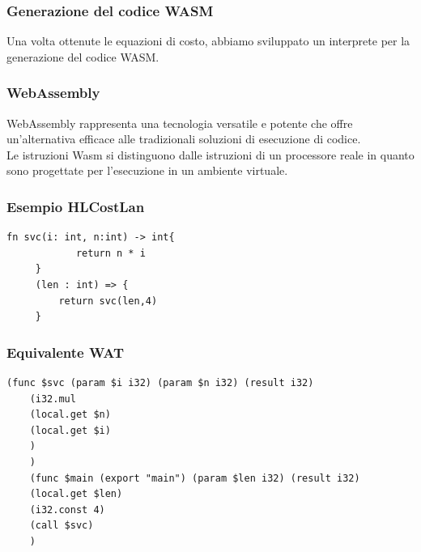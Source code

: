 \documentclass[xcolor=dvipsnames]{beamer}
\begin{document}
\begin{frame}
    \frametitle{Generazione del codice WASM}
    Una volta ottenute le equazioni di costo, abbiamo sviluppato un interprete per la generazione del codice WASM.\\

\end{frame}
\begin{frame}
    \frametitle{WebAssembly}
    \alert{WebAssembly} rappresenta una tecnologia versatile e potente che offre un'alternativa efficace alle tradizionali soluzioni di esecuzione di codice.\\
    Le istruzioni \alert{Wasm} si distinguono dalle istruzioni di un processore reale in quanto sono progettate per l'esecuzione in un ambiente virtuale.

\end{frame}
\begin{frame}[fragile]
    \frametitle{Esempio HLCostLan}
    \begin{lstlisting}[language=HLCostLan, caption={Esempio di funzione HLCostLan}]
    fn svc(i: int, n:int) -> int{
            return n * i
     }
     (len : int) => {
         return svc(len,4)
     }
    \end{lstlisting}
\end{frame}
\begin{frame}[fragile]
    \frametitle{Equivalente WAT}
    \begin{lstlisting}[language=WebAssembly, caption={codice WAT Listing 3}]
    (func $svc (param $i i32) (param $n i32) (result i32)
    (i32.mul
    (local.get $n)
    (local.get $i)
    )
    )
    (func $main (export "main") (param $len i32) (result i32)
    (local.get $len)
    (i32.const 4)
    (call $svc)
    )
        \end{lstlisting}
\end{frame}
\end{document}
